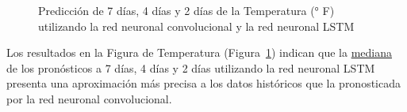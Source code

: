 \documentclass[
  us-letterpaper,
]{scrreprt}
\theoremstyle{plain}
\theoremstyle{definition}
\theoremstyle{definition}
\theoremstyle{remark}
\begin{document}
\begin{figure}


\caption{\label{fig-Temperaturapdf}Predicción de 7 días, 4 días y 2 días
de la Temperatura (° F) utilizando la red neuronal convolucional y la
red neuronal LSTM}

\end{figure}%

Los resultados en la Figura de Temperatura
(Figura~\ref{fig-Temperaturapdf}) indican que la
\hyperref[sec-Mediana]{mediana} de los pronósticos a 7 días, 4 días y 2
días utilizando la red neuronal LSTM presenta una aproximación más
precisa a los datos históricos que la pronosticada por la red neuronal
convolucional.
\end{document}
